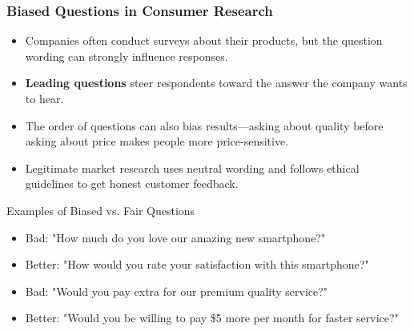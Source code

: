 \documentclass{beamer}
\begin{document}
	\begin{frame}
		\frametitle{Biased Questions in Consumer Research}
		
		\begin{itemize}
			\item Companies often conduct surveys about their products, but the question wording can strongly influence responses.
			\item \textbf{Leading questions} steer respondents toward the answer the company wants to hear.
			\item The order of questions can also bias results—asking about quality before asking about price makes people more price-sensitive.
			\item Legitimate market research uses neutral wording and follows ethical guidelines to get honest customer feedback.
		\end{itemize}
		
		\begin{alertblock}{Examples of Biased vs. Fair Questions}
			\begin{itemize}
				\item Bad: "How much do you love our amazing new smartphone?"
				\item Better: "How would you rate your satisfaction with this smartphone?"
				\item Bad: "Would you pay extra for our premium quality service?"
				\item Better: "Would you be willing to pay \$5 more per month for faster service?"
			\end{itemize}
		\end{alertblock}
		
	\end{frame}
	
\end{document}
